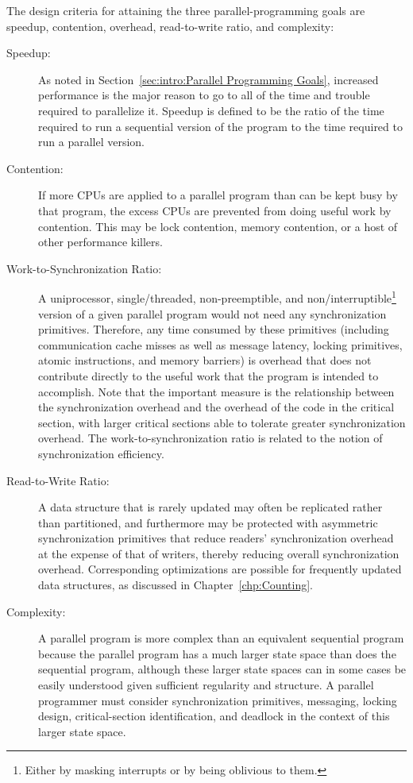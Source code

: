 The design criteria for attaining the three parallel-programming goals
are speedup,
contention, overhead, read-to-write ratio, and complexity:
\begin{description}
\item[Speedup:]  As noted in
	Section~\ref{sec:intro:Parallel Programming Goals},
	increased performance is the major reason
	to go to all of the time and trouble
	required to parallelize it.
	Speedup is defined to be the ratio of the time required
	to run a sequential version of the program to the time
	required to run a parallel version.
\item[Contention:]  If more CPUs are applied to a parallel
	program than can be kept busy by that program,
	the excess CPUs are prevented from doing
	useful work by contention.
	This may be lock contention, memory contention, or a host
	of other performance killers.
\item[Work-to-Synchronization Ratio:]  A uniprocessor,
	single\-/threaded, non-preemptible, and non\-/interruptible\footnote{
		Either by masking interrupts or by being oblivious to them.}
	version of a given parallel
	program would not need any synchronization primitives.
	Therefore, any time consumed by these primitives
	(including communication cache misses as well as
	message latency, locking primitives, atomic instructions,
	and memory barriers)
	is overhead that does not contribute directly to the useful
	work that the program is intended to accomplish.
	Note that the important measure is the
	relationship between the synchronization overhead
	and the overhead of the code in the critical section, with larger
	critical sections able to tolerate greater synchronization overhead.
	The work-to-synchronization ratio is related to
	the notion of synchronization efficiency.
\item[Read-to-Write Ratio:]  A data structure that is
	rarely updated may often be replicated rather than partitioned,
	and furthermore may be protected with asymmetric
	synchronization primitives that reduce readers' synchronization
	overhead at the expense of that of writers, thereby
	reducing overall synchronization overhead.
	Corresponding optimizations are possible for frequently
	updated data structures, as discussed in
	Chapter~\ref{chp:Counting}.
\item[Complexity:]  A parallel program is more complex than
	an equivalent sequential program because the parallel
	program has a much larger state space than does the
	sequential program, although these larger state spaces
	can in some cases be easily understood given sufficient
	regularity and structure.
	A parallel programmer must
	consider synchronization primitives, messaging, locking design,
	critical-section identification,
	and deadlock in the context of this larger state space.


\end{description}
